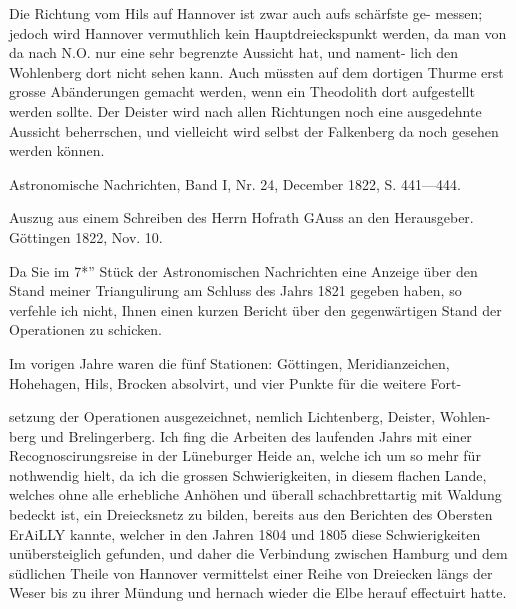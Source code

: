 \documentclass[12pt,a4paper]{article}
\theoremstyle{plain}
\theoremstyle{definition}
\theoremstyle{remark}
\begin{document}
\noindent
Die Richtung vom Hils auf Hannover ist zwar auch aufs schärfste ge-
messen; jedoch wird Hannover vermuthlich kein Hauptdreieckspunkt werden,
da man von da nach N.O. nur eine sehr begrenzte Aussicht hat, und nament-
lich den Wohlenberg dort nicht sehen kann. Auch müssten auf dem dortigen
Thurme erst grosse Abänderungen gemacht werden, wenn ein Theodolith dort
aufgestellt werden sollte. Der Deister wird nach allen Richtungen noch eine
ausgedehnte Aussicht beherrschen, und vielleicht wird selbst der Falkenberg
da noch gesehen werden können.

\noindent
Astronomische Nachrichten, Band I, Nr. 24, December 1822, S. 441---444.

\noindent
Auszug aus einem Schreiben des Herrn Hofrath GAuss an den Herausgeber.
Göttingen 1822, Nov. 10.

\noindent
Da Sie im 7*'' Stück der Astronomischen Nachrichten eine Anzeige über
den Stand meiner Triangulirung am Schluss des Jahrs 1821 gegeben haben,
so verfehle ich nicht, Ihnen einen kurzen Bericht über den gegenwärtigen
Stand der Operationen zu schicken.

\noindent
Im vorigen Jahre waren die fünf Stationen: Göttingen, Meridianzeichen,
Hohehagen, Hils, Brocken absolvirt, und vier Punkte für die weitere Fort-

\noindent

\noindent
setzung der Operationen ausgezeichnet, nemlich Lichtenberg, Deister, Wohlen-
berg und Brelingerberg. Ich fing die Arbeiten des laufenden Jahrs mit einer
Recognoscirungsreise in der Lüneburger Heide an, welche ich um so mehr
für nothwendig hielt, da ich die grossen Schwierigkeiten, in diesem flachen
Lande, welches ohne alle erhebliche Anhöhen und überall schachbrettartig
mit Waldung bedeckt ist, ein Dreiecksnetz zu bilden, bereits aus den Berichten
des Obersten ErAiLLY kannte, welcher in den Jahren 1804 und 1805 diese
Schwierigkeiten unübersteiglich gefunden, und daher die Verbindung zwischen
Hamburg und dem südlichen Theile von Hannover vermittelst einer Reihe von
Dreiecken längs der Weser bis zu ihrer Mündung und hernach wieder die
Elbe herauf effectuirt hatte.
\end{document}
